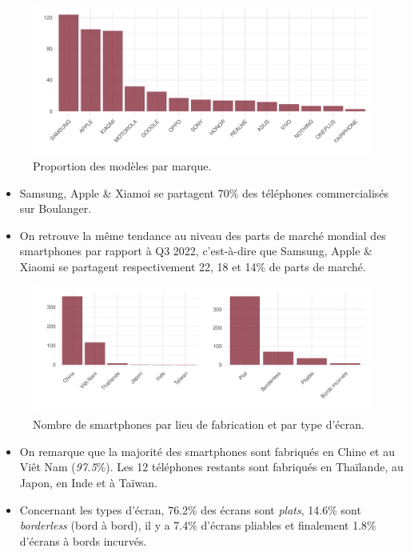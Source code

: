 \documentclass[
  12pt,
]{report}
\begin{document}
\begin{figure}[H]

{\centering \includegraphics{report_files/figure-pdf/brand_prop-1.pdf}

}

\caption{Proportion des modèles par marque.}

\end{figure}%

\begin{itemize}
\item
  Samsung, Apple \& Xiamoi se partagent 70\% des téléphones
  commercialisés sur Boulanger.
\item
  On retrouve la même tendance au niveau des parts de marché mondial des
  smartphones par rapport à Q3 2022, c'est-à-dire que Samsung, Apple \&
  Xiaomi se partagent respectivement 22, 18 et 14\% de parts de marché.
\end{itemize}

\begin{figure}[H]

{\centering \includegraphics{report_files/figure-pdf/location_prop-1.pdf}

}

\caption{Nombre de smartphones par lieu de fabrication et par type
d'écran.}

\end{figure}%

\begin{itemize}
\item
  On remarque que la majorité des smartphones sont fabriqués en Chine et
  au Viêt Nam (\emph{97.5}\%). Les 12 téléphones restants sont fabriqués
  en Thaïlande, au Japon, en Inde et à Taïwan.
\item
  Concernant les types d'écran, 76.2\% des écrans sont \emph{plats},
  14.6\% sont \emph{borderless} (bord à bord), il y a 7.4\% d'écrans
  pliables et finalement 1.8\% d'écrans à bords incurvés.
\end{itemize}
\end{document}

